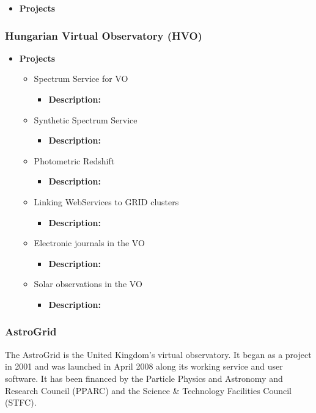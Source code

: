 \begin{itemize}
	\item \textbf{Projects}
\end{itemize}

\subsubsection{Hungarian Virtual Observatory (HVO)}
\begin{itemize}
	\item \textbf{Projects}
    \begin{itemize}
        \item Spectrum Service for VO
            \begin{itemize}
                \item \textbf{Description:}
            \end{itemize}
        \item Synthetic Spectrum Service
            \begin{itemize}
                \item \textbf{Description:}
            \end{itemize}
        \item Photometric Redshift
            \begin{itemize}
                \item \textbf{Description:}
            \end{itemize}
        \item Linking WebServices to GRID clusters
            \begin{itemize}
                \item \textbf{Description:}
            \end{itemize}
        \item Electronic journals in the VO
            \begin{itemize}
                \item \textbf{Description:}
            \end{itemize}
        \item Solar observations in the VO
            \begin{itemize}
                \item \textbf{Description:}
            \end{itemize}
     \end{itemize}
\end{itemize}

\subsubsection{AstroGrid}
The AstroGrid is the United Kingdom's virtual observatory. It began as a
project in 2001 and was launched in April 2008 along its working service and
user software. It has been financed by the Particle Physics and Astronomy and
Research Council (PPARC) and the Science \& Technology Facilities Council
(STFC).

